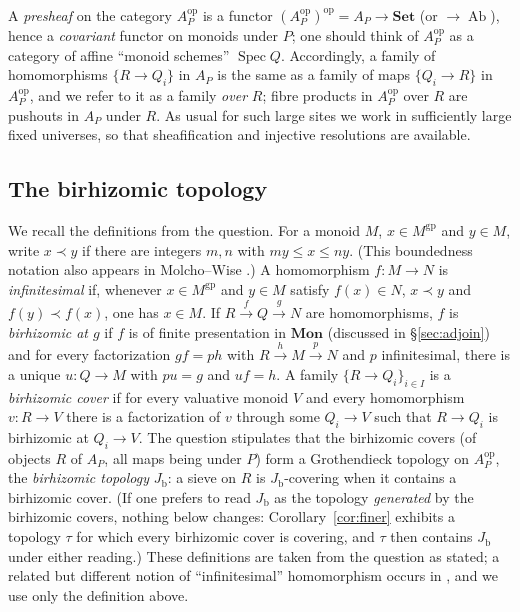 \documentclass[11pt]{article}
\newcommand{\gp}{\mathrm{gp}}
\newcommand{\Ab}{\operatorname{Ab}}
\newcommand{\Jb}{J_{\mathrm b}}
\theoremstyle{definition}
\theoremstyle{remark}
\begin{document}
A \emph{presheaf} on the category \(A_P^{\mathrm{op}}\) is a functor
\((A_P^{\mathrm{op}})^{\mathrm{op}}=A_P\to\mathbf{Set}\) (or \(\to\Ab\)),
hence a \emph{covariant} functor on monoids under \(P\); one should think of
\(A_P^{\mathrm{op}}\) as a category of affine ``monoid schemes''
\(\operatorname{Spec}Q\).  Accordingly, a family of homomorphisms
\(\{R\to Q_i\}\) in \(A_P\) is the same as a family of maps
\(\{Q_i\to R\}\) in \(A_P^{\mathrm{op}}\), and we refer to it as a family
\emph{over} \(R\); fibre products in \(A_P^{\mathrm{op}}\) over \(R\) are
pushouts in \(A_P\) under \(R\).  As usual for such large sites we work in
sufficiently large fixed universes, so that sheafification and injective
resolutions are available.

\subsection{The birhizomic topology}

We recall the definitions from the question.  For a monoid \(M\),
\(x\in M^{\gp}\) and \(y\in M\), write \(x\prec y\) if there are integers
\(m,n\) with \(my\le x\le ny\).  (This boundedness notation also appears in
Molcho--Wise \cite[Def.~2.1.3.1]{MW}.)  A homomorphism \(f:M\to N\) is
\emph{infinitesimal} if, whenever \(x\in M^{\gp}\) and \(y\in M\) satisfy
\(f(x)\in N\), \(x\prec y\) and \(f(y)\prec f(x)\), one has \(x\in M\).
If \(R\xrightarrow{f}Q\xrightarrow{g}N\) are homomorphisms, \(f\) is
\emph{birhizomic at \(g\)} if \(f\) is of finite presentation in
\(\mathbf{Mon}\) (discussed in \S\ref{sec:adjoin}) and for every factorization \(gf=ph\) with
\(R\xrightarrow{h}M\xrightarrow{p}N\) and \(p\) infinitesimal, there is a
unique \(u:Q\to M\) with \(pu=g\) and \(uf=h\).  A family
\(\{R\to Q_i\}_{i\in I}\) is a \emph{birhizomic cover} if for every valuative
monoid \(V\) and every homomorphism \(v:R\to V\) there is a factorization of
\(v\) through some \(Q_i\to V\) such that \(R\to Q_i\) is birhizomic at
\(Q_i\to V\).  The question stipulates that the birhizomic covers (of objects
\(R\) of \(A_P\), all maps being under \(P\)) form a Grothendieck topology on
\(A_P^{\mathrm{op}}\), the \emph{birhizomic topology} \(\Jb\): a sieve on
\(R\) is \(\Jb\)-covering when it contains a birhizomic cover.  (If one
prefers to read \(\Jb\) as the topology \emph{generated} by the birhizomic
covers, nothing below changes: Corollary~\ref{cor:finer} exhibits a
topology \(\tau\) for which every birhizomic cover is covering, and
\(\tau\) then contains \(\Jb\) under either reading.)  These definitions
are taken from the question as stated; a related but different notion of
``infinitesimal'' homomorphism occurs in \cite[Def.~2.1.2.9]{MW}, and we use
only the definition above.
\end{document}
